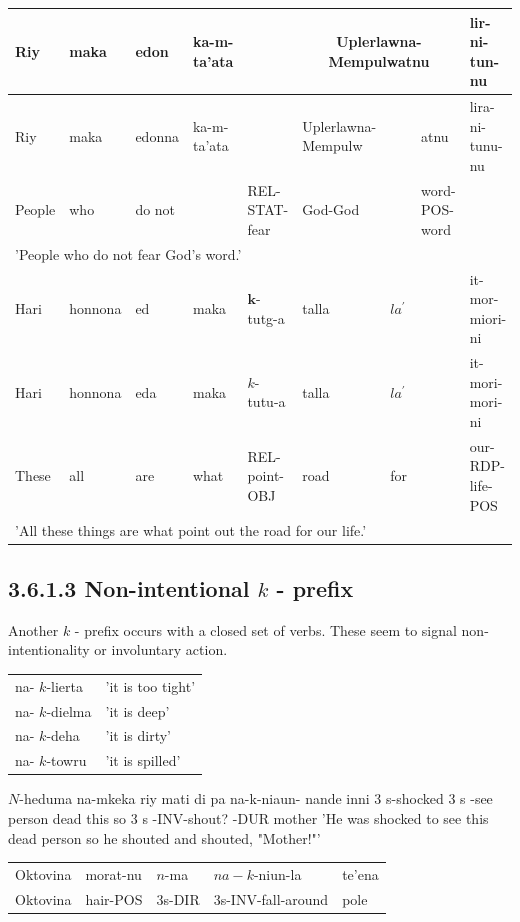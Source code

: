 \documentclass[10pt]{article}
\begin{document}
\begin{center}
\begin{tabular}{|l|l|l|l|l|l|l|l|l|}
\hline
Riy & maka & edon & ka-m-ta'ata &  & \multicolumn{3}{|c|}{Uplerlawna-Mempulwatnu} & lir-ni-tun-nu \\
\hline
Riy & maka & edonna & ka-m-ta'ata &  & Uplerlawna-Mempulw &  & atnu & lira-ni-tunu-nu \\
\hline
People & who & do not &  & REL-STAT-fear & God-God &  & word-POS-word &  \\
\hline
\multicolumn{9}{|l|}{'People who do not fear God's word.'} \\
\hline
Hari & honnona & ed & maka & \(\boldsymbol{k}\)-tutg-a & talla & \(l a^{\prime}\) &  & it-mor-miori-ni \\
\hline
Hari & honnona & eda & maka & \(k\)-tutu-a & talla & \(l a^{\prime}\) &  & it-mori-mori-ni \\
\hline
These & all & are & what & REL-point-OBJ & road & for &  & our-RDP-life-POS \\
\hline
\multicolumn{9}{|l|}{'All these things are what point out the road for our life.'} \\
\hline
\end{tabular}
\end{center}

\subsection*{3.6.1.3 Non-intentional \(k\) - prefix}
Another \(k\) - prefix occurs with a closed set of verbs. These seem to signal non-intentionality or involuntary action.

\begin{center}
\begin{tabular}{ll}
na- \(k\)-lierta & 'it is too tight' \\
na- \(k\)-dielma & 'it is deep' \\
na- \(k\)-deha & 'it is dirty' \\
na- \(k\)-towru & 'it is spilled' \\
\end{tabular}
\end{center}

\(N\)-heduma na-mkeka riy mati di pa na-k-niaun- nande inni 3 s-shocked 3 s -see person dead this so 3 s -INV-shout? -DUR mother 'He was shocked to see this dead person so he shouted and shouted, "Mother!"'

\begin{center}
\begin{tabular}{lllll}
Oktovina & morat-nu & \(n\)-ma & \(n a-k\)-niun-la & te'ena \\
Oktovina & hair-POS & 3s-DIR & 3s-INV-fall-around & pole \\
\end{tabular}
\end{center}
\end{document}
